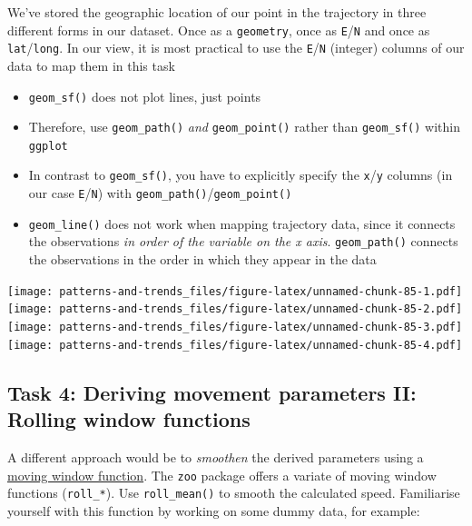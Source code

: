 \documentclass[]{book}
\providecommand{\tightlist}{%
  \setlength{\itemsep}{0pt}\setlength{\parskip}{0pt}}
\begin{document}
We've stored the geographic location of our point in the trajectory in
three different forms in our dataset. Once as a \texttt{geometry}, once
as \texttt{E}/\texttt{N} and once as \texttt{lat}/\texttt{long}. In our
view, it is most practical to use the \texttt{E}/\texttt{N} (integer)
columns of our data to map them in this task

\begin{itemize}
\tightlist
\item
  \texttt{geom\_sf()} does not plot lines, just points
\item
  Therefore, use \texttt{geom\_path()} \emph{and} \texttt{geom\_point()}
  rather than \texttt{geom\_sf()} within \texttt{ggplot}
\item
  In contrast to \texttt{geom\_sf()}, you have to explicitly specify the
  \texttt{x}/\texttt{y} columns (in our case \texttt{E}/\texttt{N}) with
  \texttt{geom\_path()}/\texttt{geom\_point()}
\item
  \texttt{geom\_line()} does not work when mapping trajectory data,
  since it connects the observations \emph{in order of the variable on
  the x axis}. \texttt{geom\_path()} connects the observations in the
  order in which they appear in the data
\end{itemize}

\texttt{[image: patterns-and-trends\_files/figure-latex/unnamed-chunk-85-1.pdf]}
\texttt{[image: patterns-and-trends\_files/figure-latex/unnamed-chunk-85-2.pdf]}
\texttt{[image: patterns-and-trends\_files/figure-latex/unnamed-chunk-85-3.pdf]}
\texttt{[image: patterns-and-trends\_files/figure-latex/unnamed-chunk-85-4.pdf]}

\subsection{Task 4: Deriving movement parameters II: Rolling window
functions}\label{task-4-deriving-movement-parameters-ii-rolling-window-functions}

A different approach would be to \emph{smoothen} the derived parameters
using a
\href{https://docs.wavefront.com/images/5sec_moving_window.png}{moving
window function}. The \texttt{zoo} package offers a variate of moving
window functions (\texttt{roll\_*}). Use \texttt{roll\_mean()} to smooth
the calculated speed. Familiarise yourself with this function by working
on some dummy data, for example:
\end{document}
